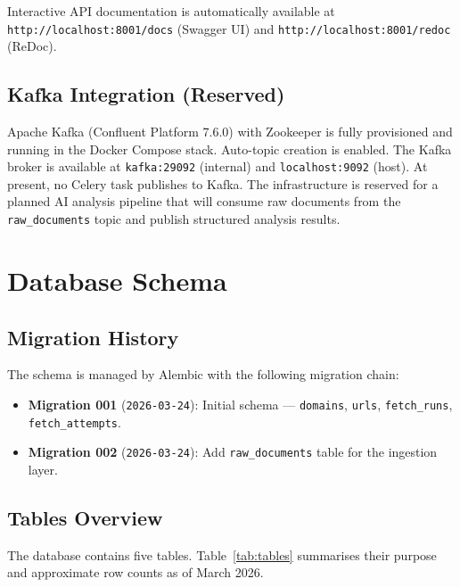 \documentclass[12pt,a4paper]{article}
\begin{document}
Interactive API documentation is automatically available at \texttt{http://localhost:8001/docs} (Swagger UI) and \texttt{http://localhost:8001/redoc} (ReDoc).

\subsection{Kafka Integration (Reserved)}

Apache Kafka (Confluent Platform 7.6.0) with Zookeeper is fully provisioned and running in the Docker Compose stack. Auto-topic creation is enabled. The Kafka broker is available at \texttt{kafka:29092} (internal) and \texttt{localhost:9092} (host). At present, no Celery task publishes to Kafka. The infrastructure is reserved for a planned AI analysis pipeline that will consume raw documents from the \texttt{raw\_documents} topic and publish structured analysis results.

\section{Database Schema}

\subsection{Migration History}

The schema is managed by Alembic with the following migration chain:

\begin{itemize}[noitemsep]
  \item \textbf{Migration 001} (\texttt{2026-03-24}): Initial schema — \texttt{domains}, \texttt{urls}, \texttt{fetch\_runs}, \texttt{fetch\_attempts}.
  \item \textbf{Migration 002} (\texttt{2026-03-24}): Add \texttt{raw\_documents} table for the ingestion layer.
\end{itemize}

\subsection{Tables Overview}

The database contains five tables. Table~\ref{tab:tables} summarises their purpose and approximate row counts as of March 2026.
\end{document}
